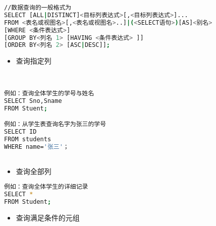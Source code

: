 \begin{lstlisting}[language=bash]
//数据查询的一般格式为
SELECT [ALL|DISTINCT]<目标列表达式>[,<目标列表达式>]...
FROM <表名或视图名>[,<表名或视图名>..]|(<SELECT语句>)[AS]<别名>
[WHERE <条件表达式>]
[GROUP BY<列名 1> [HAVING <条件表达式> ]]
[ORDER BY<列名 2> [ASC|DESC]];
\end{lstlisting}



\begin{itemize}
\item 查询指定列
\end{itemize}

\begin{lstlisting}[language=bash]


例如：查询全体学生的学号与姓名
SELECT Sno,Sname
FROM Stuent;

例如：从学生表查询名字为张三的学号
SELECT ID
FROM students
WHERE name='张三'；



\end{lstlisting}


\begin{itemize}
\item  查询全部列
\end{itemize}
\begin{lstlisting}[language=bash]
例如：查询全体学生的详细记录
SELECT *
FROM Student;
\end{lstlisting}



\begin{itemize}
\item 查询满足条件的元组 
\end{itemize}

